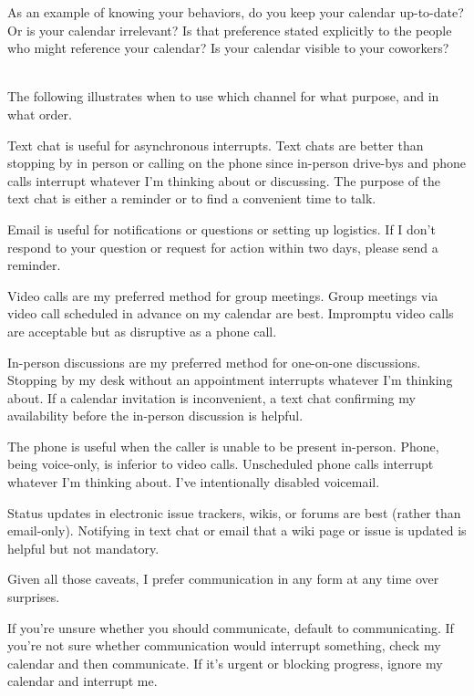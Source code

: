 As an example of knowing your behaviors, do you keep your calendar up-to-date? Or is your calendar irrelevant? Is that preference stated explicitly to the people who might reference your calendar? Is your calendar visible to your coworkers?

\ \\

The following illustrates when to use which channel for what purpose, and in what order. 

Text chat is useful for asynchronous interrupts. Text chats are better than stopping by in person or calling on the phone since in-person drive-bys and phone calls interrupt whatever I'm thinking about or discussing. The purpose of the text chat is either a reminder or to find a convenient time to talk. 

Email is useful for notifications or questions or setting up logistics. If I don't respond to your question or request for action within two days, please send a reminder. 

Video calls are my preferred method for group meetings. Group meetings via video call scheduled in advance on my calendar are best. Impromptu video calls are acceptable but as disruptive as a phone call. 

In-person discussions are my preferred method for one-on-one discussions. Stopping by my desk  without an appointment interrupts whatever I'm thinking about. If a calendar invitation is inconvenient, a text chat confirming my availability before the in-person discussion is helpful. 

The phone is useful when the caller is unable to be present in-person. Phone, being voice-only, is inferior to video calls. Unscheduled phone calls interrupt whatever I'm thinking about. I've intentionally disabled voicemail. 

Status updates in electronic issue trackers, wikis, or forums are best (rather than email-only). Notifying in text chat or email that a wiki page or issue is updated is helpful but not mandatory. 

Given all those caveats, I prefer communication in any form at any time over surprises. 

If you're unsure whether you should communicate, default to communicating. If you're not sure whether communication would interrupt something, check my calendar and then communicate. If it's urgent or blocking progress, ignore my calendar and interrupt me. 

\ \\

